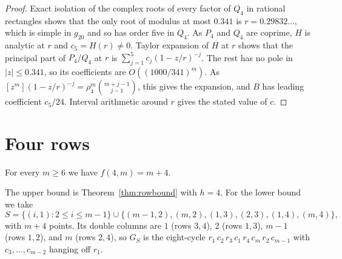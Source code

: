 \begin{proof}
Exact isolation of the complex roots of every factor of $Q_4$ in rational rectangles shows that the only root of modulus at most $0.341$ is $r=0.29832\ldots$, which is simple in $g_{20}$ and so has order five in $Q_4$. As $P_4$ and $Q_4$ are coprime, $H$ is analytic at $r$ and $c_5=H(r)\ne0$. Taylor expansion of $H$ at $r$ shows that the principal part of $P_4/Q_4$ at $r$ is $\sum_{j=1}^{5}c_j(1-z/r)^{-j}$. The rest has no pole in $|z|\le0.341$, so its coefficients are $O((1000/341)^m)$. As $[z^m](1-z/r)^{-j}=\rho_4^m\binom{m+j-1}{j-1}$, this gives the expansion, and $B$ has leading coefficient $c_5/24$. Interval arithmetic around $r$ gives the stated value of $c$.
\end{proof}

\section{Four rows}\label{sec:four}

\begin{theorem}\label{thm:fourvalue}
For every $m\ge6$ we have $f(4,m)=m+4$.
\end{theorem}

The upper bound is Theorem~\ref{thm:rowbound} with $h=4$. For the lower bound we take
\begin{equation}\label{eq:fourS}
S=\{(i,1):2\le i\le m-1\}\cup\{(m-1,2),(m,2),(1,3),(2,3),(1,4),(m,4)\},
\end{equation}
with $m+4$ points. Its double columns are $1$ (rows $3,4$), $2$ (rows $1,3$), $m-1$ (rows $1,2$), and $m$ (rows $2,4$), so $G_S$ is the eight-cycle $r_1\,c_2\,r_3\,c_1\,r_4\,c_m\,r_2\,c_{m-1}$ with $c_3,\ldots,c_{m-2}$ hanging off $r_1$.

